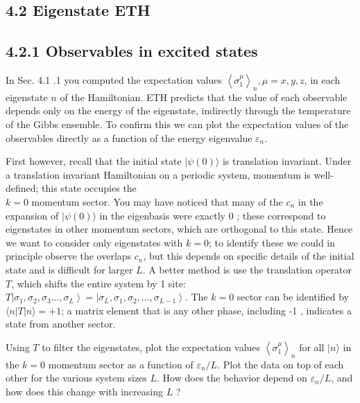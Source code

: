 \documentclass[12pt]{article}
\begin{document}
\subsection*{4.2 Eigenstate ETH}
\subsection*{4.2.1 Observables in excited states}
In Sec. 4.1 .1 you computed the expectation values $\left\langle\sigma_{1}^{\mu}\right\rangle_{n}, \mu=x, y, z$, in each eigenstate $n$ of the Hamiltonian. ETH predicts that the value of each observable depends only on the energy of the eigenstate, indirectly through the temperature of the Gibbs ensemble. To confirm this we can plot the expectation values of the observables directly as a function of the energy eigenvalue $\varepsilon_{n}$.

First however, recall that the initial state $|\psi(0)\rangle$ is translation invariant. Under a translation invariant Hamiltonian on a periodic system, momentum is well-defined; this state occupies the\\
$k=0$ momentum sector. You may have noticed that many of the $c_{n}$ in the expansion of $|\psi(0)\rangle$ in the eigenbasis were exactly 0 ; these correspond to eigenstates in other momentum sectors, which are orthogonal to this state. Hence we want to consider only eigenstates with $k=0$; to identify these we could in principle observe the overlaps $c_{n}$, but this depends on specific details of the initial state and is difficult for larger $L$. A better method is use the translation operator $T$, which shifts the entire system by 1 site: $T\left|\sigma_{1}, \sigma_{2}, \sigma_{3} \ldots, \sigma_{L}\right\rangle=\left|\sigma_{L}, \sigma_{1}, \sigma_{2}, \ldots, \sigma_{L-1}\right\rangle$. The $k=0$ sector can be identified by $\langle n|T| n\rangle=+1$; a matrix element that is any other phase, including -1 , indicates a state from another sector.

Using $T$ to filter the eigenstates, plot the expectation values $\left\langle\sigma_{1}^{\mu}\right\rangle_{n}$ for all $|n\rangle$ in the $k=0$ momentum sector as a function of $\varepsilon_{n} / L$. Plot the data on top of each other for the various system sizes $L$. How does the behavior depend on $\varepsilon_{n} / L$, and how does this change with increasing $L$ ?
\end{document}
